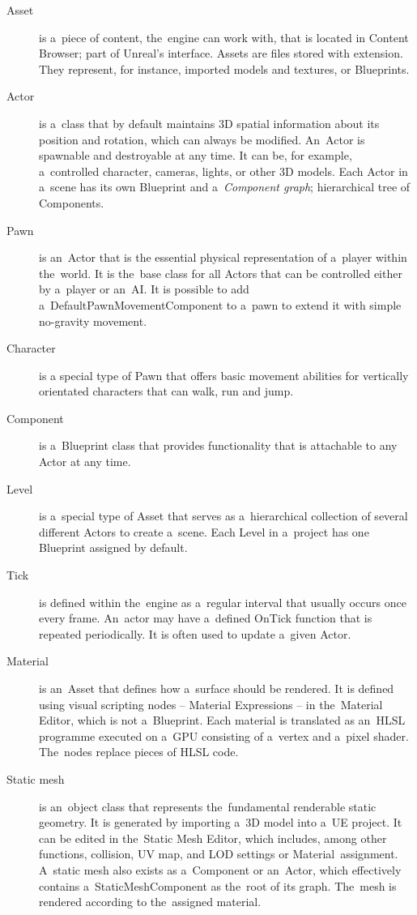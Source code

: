 \begin{description}
    \item[Asset] is a~piece of content, the~engine can work with, that is located in Content Browser; part of Unreal's interface. Assets are files stored with  extension. They represent, for instance, imported models and textures, or Blueprints.
    \item[Actor] is a~class that by default maintains 3D spatial information about its position and rotation, which can always be modified. An~Actor is spawnable and destroyable at any time. It can be, for example, a~controlled character, cameras, lights, or other 3D models. Each Actor in a~scene has its own Blueprint and a~\emph{Component graph}; hierarchical tree of Components.
    \item[Pawn] is an~Actor that is the essential physical representation of a~player within the~world. It is the~base class for all Actors that can be controlled either by a~player or an~AI. It is possible to add a~DefaultPawnMovementComponent to a~pawn to extend it with simple no-gravity movement.
    \item[Character] is a special type of Pawn that offers basic movement abilities for vertically orientated characters that can walk, run and jump.
    \item[Component] is a~Blueprint class that provides functionality that is attachable to any Actor at any time. 
    \item[Level] is a~special type of Asset that serves as a~hierarchical collection of several different Actors to create a~scene. Each Level in a~project has one Blueprint assigned by default.
    \item[Tick] is defined within the~engine as a~regular interval that usually occurs once every frame. An~actor may have a~defined OnTick function that is repeated periodically. It is often used to update a~given Actor.
    \item[Material] is an~Asset that defines how a~surface should be rendered. It is defined using visual scripting nodes -- Material Expressions -- in the~Material Editor, which is not a~Blueprint. Each material is translated as an~HLSL programme executed on a~GPU consisting of a~vertex and a~pixel shader. The~nodes replace pieces of HLSL code.
    \item[Static mesh] is an~object class that represents the~fundamental renderable static geometry. It is generated by importing a~3D model into a~UE project. It can be edited in the~Static Mesh Editor, which includes, among other functions, collision, UV map, and LOD settings or Material~assignment. A~static mesh also exists as a~Component or an~Actor, which effectively contains a~StaticMeshComponent as the~root of its graph. The~mesh is rendered according to the~assigned material.

\end{description}
